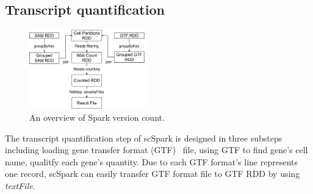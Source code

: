 \documentclass[conference]{IEEEtran}
\begin{document}

\subsection{Transcript quantification}
\begin{figure}
\centering
	\includegraphics[width=0.45\textwidth]{figure3.png}
	\caption{An overview of Spark version count.} \label{fig3}
\end{figure}

The transcript quantification step of scSpark is designed in three substeps including loading gene transfer format (GTF)~\cite{breese2013ngsutils} file, using GTF to find gene's cell name, qualitfy each gene's quantity.
Due to each GTF format's line represents one record, scSpark can easily transfer GTF format file to GTF RDD by using \textit{textFile}.
\end{document}
